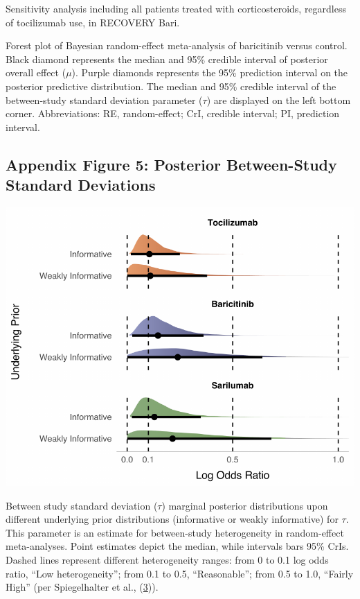 \documentclass[
  12pt,
]{article}
\begin{document}
Sensitivity analysis including all patients treated with
corticosteroids, regardless of tocilizumab use, in RECOVERY Bari.

Forest plot of Bayesian random-effect meta-analysis of baricitinib
versus control. Black diamond represents the median and 95\% credible
interval of posterior overall effect (\(\mu\)). Purple diamonds
represents the 95\% prediction interval on the posterior predictive
distribution. The median and 95\% credible interval of the between-study
standard deviation parameter (\(\tau\)) are displayed on the left bottom
corner. Abbreviations: RE, random-effect; CrI, credible interval; PI,
prediction interval.

\newpage

\hypertarget{appendix-figure-5-posterior-between-study-standard-deviations}{%
\subsection{Appendix Figure 5: Posterior Between-Study Standard
Deviations}\label{appendix-figure-5-posterior-between-study-standard-deviations}}

\begin{center}\includegraphics{supplementary_material_files/figure-latex/tau figure display-1} \end{center}

Between study standard deviation (\(\tau\)) marginal posterior
distributions upon different underlying prior distributions (informative
or weakly informative) for \(\tau\). This parameter is an estimate for
between-study heterogeneity in random-effect meta-analyses. Point
estimates depict the median, while intervals bars 95\% CrIs. Dashed
lines represent different heterogeneity ranges: from 0 to 0.1 log odds
ratio, ``Low heterogeneity''; from 0.1 to 0.5, ``Reasonable''; from 0.5
to 1.0, ``Fairly High'' (per Spiegelhalter et al.,
(\protect\hyperlink{ref-spiegelhalter2004}{3})).
\end{document}
